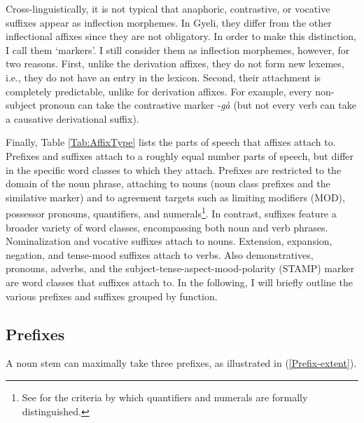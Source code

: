 Cross-linguistically, it is not typical that   anaphoric, contrastive, or vocative suffixes appear as inflection morphemes. In Gyeli, they differ from the other inflectional affixes since they are not obligatory. In order to make this distinction, I  call them `markers'. I still consider them as inflection morphemes, however, for two reasons. First, unlike the derivation affixes, they do not form new lexemes, i.e., they do not have an entry in the lexicon. Second, their attachment is completely predictable, unlike for derivation affixes. For example, every non-subject pronoun can take the contrastive marker -{\itshape gà} (but not every verb can take a causative derivational suffix). 

Finally, Table \ref{Tab:AffixType} lists the parts of speech that affixes attach to. Prefixes and suffixes attach to a roughly equal number parts of speech,
but differ in the specific word classes to which they attach. Prefixes are restricted to the domain of the noun phrase,  attaching to nouns (noun class prefixes and the similative marker) and to agreement targets  such as limiting modifiers (MOD), possessor pronouns, quantifiers, and numerals\footnote{See  for the criteria by which quantifiers  and numerals are formally distinguished.}. In contrast, suffixes feature a broader variety of word classes, encompassing both noun and verb phrases. Nominalization and vocative  suffixes attach to nouns. Extension, expansion, negation, and tense-mood suffixes attach to verbs. Also demonstratives, pronouns, adverbs, and the subject-tense-aspect-mood-polarity (STAMP) marker are word classes that suffixes attach to. In the following, I will briefly outline the various prefixes and suffixes grouped by function.

 




\subsection{Prefixes}
\label{sec:Prefix}

A noun stem can maximally take three prefixes, as illustrated in (\ref{Prefix-extent}).

